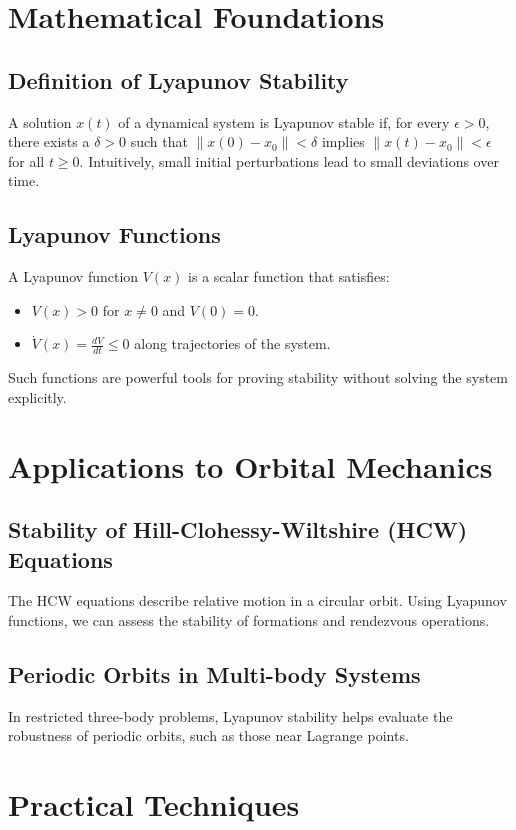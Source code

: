\documentclass[11pt]{article}
\begin{document}
\section{Mathematical Foundations}
\subsection{Definition of Lyapunov Stability}
A solution $x(t)$ of a dynamical system is Lyapunov stable if, for every $\epsilon > 0$, there exists a $\delta > 0$ such that $\|x(0) - x_0\| < \delta$ implies $\|x(t) - x_0\| < \epsilon$ for all $t \geq 0$. Intuitively, small initial perturbations lead to small deviations over time.

\subsection{Lyapunov Functions}
A Lyapunov function $V(x)$ is a scalar function that satisfies:
\begin{itemize}
    \item $V(x) > 0$ for $x \neq 0$ and $V(0) = 0$.
    \item $\dot{V}(x) = \frac{dV}{dt} \leq 0$ along trajectories of the system.
\end{itemize}
Such functions are powerful tools for proving stability without solving the system explicitly.

\section{Applications to Orbital Mechanics}
\subsection{Stability of Hill-Clohessy-Wiltshire (HCW) Equations}
The HCW equations describe relative motion in a circular orbit. Using Lyapunov functions, we can assess the stability of formations and rendezvous operations.

\subsection{Periodic Orbits in Multi-body Systems}
In restricted three-body problems, Lyapunov stability helps evaluate the robustness of periodic orbits, such as those near Lagrange points.

\section{Practical Techniques}
\end{document}
